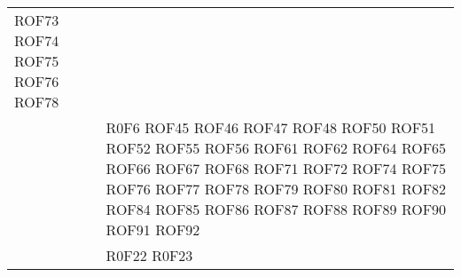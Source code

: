 \documentclass[../DefinizioneDiProdotto.tex]{subfiles}
\begin{document}
\begin{longtable}{p{8.5cm}!{\VRule[1pt]}p{2.5cm}}
ROF73 \newline 
ROF74 \newline 
ROF75 \newline 
ROF76 \newline 
ROF78 \\
 & R0F6 \newline 
ROF45 \newline 
ROF46 \newline 
ROF47 \newline 
ROF48 \newline 
ROF50 \newline 
ROF51 \newline 
ROF52 \newline 
ROF55 \newline 
ROF56 \newline 
ROF61 \newline 
ROF62 \newline 
ROF64 \newline 
ROF65 \newline 
ROF66 \newline 
ROF67 \newline 
ROF68 \newline 
ROF71 \newline 
ROF72 \newline 
ROF74 \newline 
ROF75 \newline 
ROF76 \newline 
ROF77 \newline 
ROF78 \newline 
ROF79 \newline 
ROF80 \newline 
ROF81 \newline 
ROF82 \newline 
ROF84 \newline 
ROF85 \newline 
ROF86 \newline 
ROF87 \newline 
ROF88 \newline 
ROF89 \newline 
ROF90 \newline 
ROF91 \newline 
ROF92 \\
 & R0F22 \newline 
R0F23 \newline 

\end{longtable}
\end{document}
